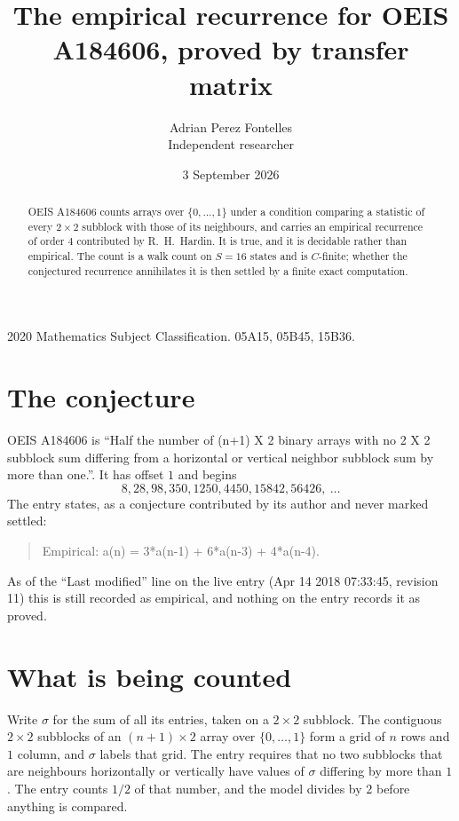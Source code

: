 \documentclass[11pt,a4paper]{article}
\title{The empirical recurrence for OEIS A184606, proved by transfer matrix}
\author{Adrian Perez Fontelles\\ \small Independent researcher}
\date{3 September 2026}
\theoremstyle{plain}
\theoremstyle{definition}
\begin{document}
\maketitle

\begin{abstract}
OEIS A184606 counts arrays over $\{0,\dots,1\}$ under a condition comparing a statistic of
every $2\times2$ subblock with those of its neighbours, and carries an empirical recurrence
of order $4$ contributed by R.~H.~Hardin. It is true, and it is decidable rather than
empirical. The count is a walk count on $S=16$ states and is $C$-finite; whether the
conjectured recurrence annihilates it is then settled by a finite exact computation.
\end{abstract}

\noindent\small 2020 Mathematics Subject Classification. 05A15, 05B45, 15B36.\normalsize

\section{The conjecture}

OEIS A184606 is ``Half the number of (n+1) X 2 binary arrays with no 2 X 2 subblock sum differing from a horizontal or vertical neighbor subblock sum by more than one.''. It has offset $1$ and begins
\[
8, 28, 98, 350, 1250, 4450, 15842, 56426,\ \dots
\]
The entry states, as a conjecture contributed by its author and never marked settled:
\begin{quote}
Empirical: a(n) = 3*a(n-1) + 6*a(n-3) + 4*a(n-4).
\end{quote}
As of the ``Last modified'' line on the live entry (Apr 14 2018 07:33:45, revision 11) this is still
recorded as empirical, and nothing on the entry records it as proved.

\section{What is being counted}

Write $\sigma$ for the sum of all its entries, taken on a $2\times2$ subblock. The contiguous $2\times2$
subblocks of an $(n+1)\times2$ array over $\{0,\dots,1\}$ form a grid of $n$ rows
and $1$ column, and $\sigma$ labels that grid. The entry
requires that no two subblocks that are neighbours horizontally or vertically have values of $\sigma$ differing by more than $1$. The entry counts $1/2$ of that number, and the model divides by $2$ before anything is compared.
\end{document}
